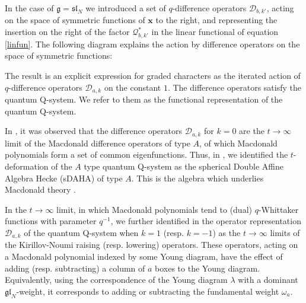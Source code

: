 \documentclass[12pt]{amsart}
\newcommand{\g}{{\mathfrak{g}}}
\newcommand{\gl}{{\mathfrak{gl}}}
\renewcommand{\sl}{{\mathfrak{sl}}}
\newcommand{\Q}{{\mathcal Q}}
\newcommand{\bn}{{\mathbf n}}
\newcommand{\bx}{{\mathbf x}}
\numberwithin{equation}{section}
\numberwithin{table}{section}
\begin{document}
In the case of $\g=\sl_N$ we introduced \cite{DFK15,DFK16} a set of $q$-difference operators 
${\mathcal D}_{b,k'}$,  acting on the space of symmetric functions of $\bx$ to the right, and representing the insertion on the right of the factor $\Q^*_{b,k'}$ in the linear functional of equation \eqref{linfun}. 
The following diagram explains the action by difference operators on the space of symmetric functions:
\begin{center}
\end{center}
The result is an explicit expression for graded characters as the iterated action of 
$q$-difference operators ${\mathcal D}_{a,k}$ on the constant $1$.
The difference operators satisfy the quantum Q-system. We refer to them as the functional representation of the quantum Q-system. 

In \cite{DFK15}, it was observed that the difference operators $\mathcal D_{a,k}$ for $k=0$ are the $t\to \infty$ limit of
the Macdonald difference operators of type $A$, of which Macdonald polynomials form a set of common eigenfunctions.
Thus, in \cite{DFKqt}, we identified the  $t$-deformation of the $A$ type quantum Q-system as the spherical Double Affine Algebra Hecke (sDAHA) of type $A$. This is the algebra which underlies Macdonald theory \cite{macdo,Cheredbook}.


In the $t\to\infty$ limit, in which Macdonald polynomials tend to (dual) $q$-Whittaker functions with parameter $q^{-1}$, we further
identified in \cite{DFK15} the operator  representation ${\mathcal D}_{a,k}$ of the quantum Q-system when $k=1$ (resp. $k=-1$) as 
the $t\to\infty$ limits of the Kirillov-Noumi \cite{Kinoum} raising (resp. lowering) operators. These operators, acting on a Macdonald polynomial indexed by some Young diagram,
have the effect of adding (resp. subtracting) a column of $a$ boxes to the Young diagram. Equivalently, using the correspondence of the Young diagram $\lambda$ with a dominant $\gl_N$-weight, it corresponds to adding or subtracting the fundamental weight $\omega_a$.
\end{document}
